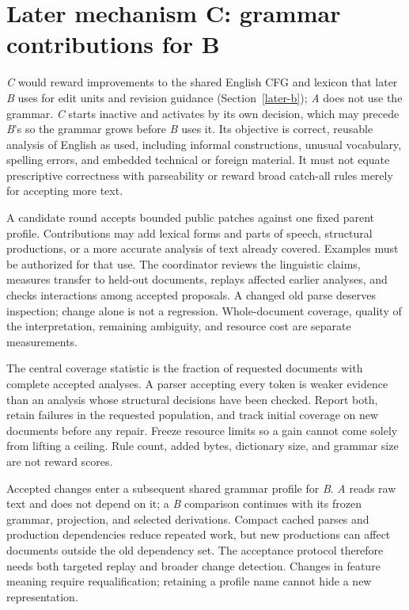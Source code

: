 \section{Later mechanism C: grammar contributions for B}\label{grammar-contributions}

\textit{C} would reward improvements to the shared English CFG and lexicon that
later \textit{B} uses for edit units and revision guidance
(Section~\ref{later-b}); \textit{A} does not use the grammar. \textit{C} starts
inactive and activates by its own decision, which may precede \textit{B}'s so
the grammar grows before \textit{B} uses it. Its objective is correct, reusable
analysis of English as
used, including informal constructions, unusual vocabulary, spelling errors,
and embedded technical or foreign material. It must not equate prescriptive
correctness with parseability or reward broad catch-all rules merely for
accepting more text.

A candidate round accepts bounded public patches against one fixed parent
profile. Contributions may add lexical forms and parts of speech, structural
productions, or a more accurate analysis of text already covered. Examples must
be authorized for that use. The coordinator reviews the linguistic claims,
measures transfer to held-out documents, replays affected earlier analyses, and
checks interactions among accepted proposals. A changed old parse deserves
inspection; change alone is not a regression. Whole-document coverage, quality
of the interpretation, remaining ambiguity, and resource cost are separate
measurements.

The central coverage statistic is the fraction of requested documents with
complete accepted analyses. A parser accepting every token is weaker evidence
than an analysis whose structural decisions have been checked. Report both,
retain failures in the requested population, and track initial coverage on new
documents before any repair. Freeze resource limits so a gain cannot come solely
from lifting a ceiling. Rule count, added bytes, dictionary size, and grammar
size are not reward scores.

Accepted changes enter a subsequent shared grammar profile for \textit{B}.
\textit{A} reads raw text and does not depend on it; a \textit{B} comparison
continues with its frozen grammar, projection, and selected derivations.
Compact cached parses and production dependencies reduce repeated work, but
new productions can affect documents outside the old dependency set. The
acceptance protocol therefore needs both targeted replay and broader change
detection. Changes in feature meaning require requalification; retaining a
profile name cannot hide a new representation.


